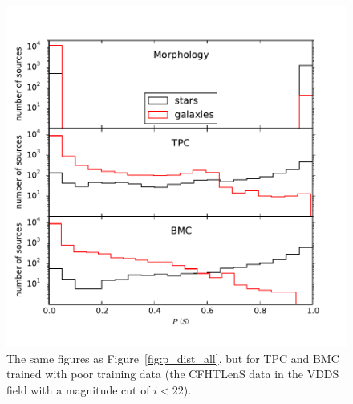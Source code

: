 \documentclass[useAMS,usenatbib]{mn2e}
\begin{document}
\begin{figure}
  \includegraphics[width=\linewidth]{figures/p_dist_cut.pdf}
  \caption{The same figures as Figure~\ref{fig:p_dist_all},
           but for TPC and BMC trained with 
           poor training data
           (the CFHTLenS data in the VDDS field
           with a magnitude cut of $i<22$).}
  \label{fig:p_dist_cut}
\end{figure}


%
\end{document}
